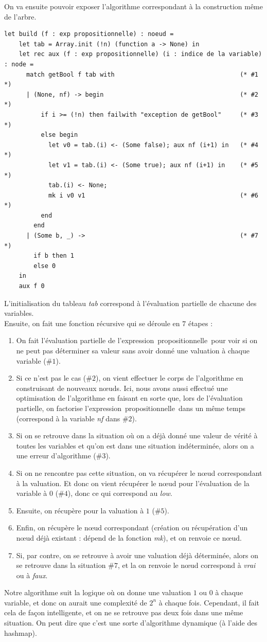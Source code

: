 \documentclass[a4paper, oneside]{report}
\newcommand{\expp}{expression~propositionnelle~}
\begin{document}
On va ensuite pouvoir exposer l'algorithme correspondant à la construction même de l'arbre.
\begin{lstlisting}
let build (f : exp propositionnelle) : noeud = 
    let tab = Array.init (!n) (function a -> None) in
    let rec aux (f : exp propositionnelle) (i : indice de la variable) : node =
      match getBool f tab with 									(* #1 *)
      | (None, nf) -> begin										(* #2 *)
          if i >= (!n) then failwith "exception de getBool"		(* #3 *)
          else begin
            let v0 = tab.(i) <- (Some false); aux nf (i+1) in	(* #4 *)
            let v1 = tab.(i) <- (Some true); aux nf (i+1) in	(* #5 *)
            tab.(i) <- None;	
            mk i v0 v1											(* #6 *)
          end
        end
      | (Some b, _) -> 											(* #7 *)
        if b then 1
        else 0
    in
    aux f 0
\end{lstlisting}
L'initialisation du tableau \textit{tab} correspond à l'évaluation partielle de chacune des variables.\\
Ensuite, on fait une fonction récursive qui se déroule en $7$ étapes :
\begin{enumerate}
\item On fait l'évaluation partielle de l'\expp pour voir si on ne peut pas déterminer sa valeur sans avoir donné une valuation à chaque variable ($\#1$).\\
\item Si ce n'est pas le cas ($\#2$), on vient effectuer le corps de l'algorithme en construisant de nouveaux nœuds. Ici, nous avons aussi effectué une optimisation de l'algorithme en faisant en sorte que, lors de l'évaluation partielle, on factorise l'\expp dans un même temps (correspond à la variable \textit{nf} dans $\#2$).
\item Si on se retrouve dans la situation où on a déjà donné une valeur de vérité à toutes les variables et qu'on est dans une situation indéterminée, alors on a une erreur d'algorithme ($\#3$).
\item Si on ne rencontre pas cette situation, on va récupérer le nœud correspondant à la valuation. Et donc on vient récupérer le nœud pour l'évaluation de la variable à $0$ ($\#4$), donc ce qui correspond au \textit{low}.
\item Ensuite, on récupère pour la valuation à $1$ ($\#5$).\\
\item Enfin, on récupère le nœud correspondant (création ou récupération d'un nœud déjà existant : dépend de la fonction \textit{mk}), et on renvoie ce nœud.
\item Si, par contre, on se retrouve à avoir une valuation déjà déterminée, alors on se retrouve dans la situation $\#7$, et la on renvoie le nœud correspond à \textit{vrai} ou à \textit{faux}.
\end{enumerate}
Notre algorithme suit la logique où on donne une valuation $1$ ou $0$ à chaque variable, et donc on aurait une complexité de $2^n$ à chaque fois. Cependant, il fait cela de façon intelligente, et on ne se retrouve pas deux fois dans une même situation. On peut dire que c'est une sorte d'algorithme dynamique (à l'aide des hashmap).\\
\end{document}
